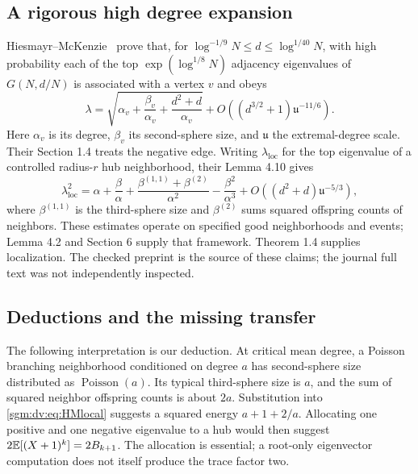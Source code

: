 \documentclass[11pt,letterpaper]{article}
\theoremstyle{remark}\newtheorem{remark}[theorem]{Remark}
\newcommand{\Poi}{\operatorname{Poisson}}\newcommand{\Bin}{\operatorname{Bin}}
\theoremstyle{definition}\newtheorem{definition}[theorem]{Definition}
\begin{document}
\subsection{A rigorous high degree expansion}
Hiesmayr--McKenzie~\cite[Theorem 1.2]{hm} prove that, for
$\log^{-1/9}N\le d\le\log^{1/40}N$, with high probability each of the top $\exp(\log^{1/8}N)$ adjacency eigenvalues of $G(N,d/N)$ is associated with a vertex $v$ and obeys
\begin{equation}\label{sgm:dv:eq:HM}
 \lambda=\sqrt{\alpha_v+\frac{\beta_v}{\alpha_v}
                    +\frac{d^2+d}{\alpha_v}}
       +O((d^{3/2}+1)\mathfrak u^{-11/6}).
\end{equation}
Here $\alpha_v$ is its degree, $\beta_v$ its second-sphere size, and $\mathfrak u$ the extremal-degree scale. Their Section 1.4 treats the negative edge. Writing $\lambda_{\mathrm{loc}}$ for the top eigenvalue of a controlled radius-$r$ hub neighborhood, their Lemma 4.10 gives
\begin{equation}\label{sgm:dv:eq:HMlocal}
 \lambda_{\mathrm{loc}}^2=\alpha+\frac\beta\alpha
     +\frac{\beta^{(1,1)}+\beta^{(2)}}{\alpha^2}
     -\frac{\beta^2}{\alpha^3}
     +O((d^2+d)\mathfrak u^{-5/3}),
\end{equation}
where $\beta^{(1,1)}$ is the third-sphere size and $\beta^{(2)}$ sums squared offspring counts of neighbors. These estimates operate on specified good neighborhoods and events; Lemma 4.2 and Section 6 supply that framework. Theorem 1.4 supplies localization. The checked preprint is the source of these claims; the journal full text was not independently inspected.

\subsection{Deductions and the missing transfer}
The following interpretation is our deduction. At critical mean degree, a Poisson branching neighborhood conditioned on degree $a$ has second-sphere size distributed as $\Poi(a)$. Its typical third-sphere size is $a$, and the sum of squared neighbor offspring counts is about $2a$. Substitution into \eqref{sgm:dv:eq:HMlocal} suggests a squared energy $a+1+2/a$. Allocating one positive and one negative eigenvalue to a hub would then suggest $2\mathbb E[(X+1)^k]=2B_{k+1}$. The allocation is essential; a root-only eigenvector computation does not itself produce the trace factor two.
\end{document}
